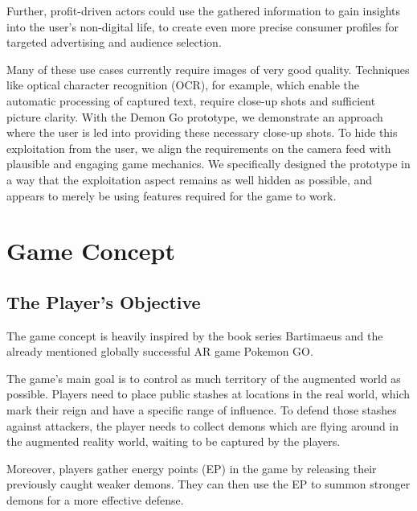 Further, profit-driven actors could use the gathered information to gain insights into the user's non-digital life, to create even more precise consumer profiles for targeted advertising and audience selection.

Many of these use cases currently require images of very good quality.
Techniques like optical character recognition (OCR), for example, which enable the automatic processing of captured text, require close-up shots and sufficient picture clarity.
With the Demon Go prototype, we demonstrate an approach where the user is led into providing these necessary close-up shots.
To hide this exploitation from the user, we align the requirements on the camera feed with plausible and engaging game mechanics.
We specifically designed the prototype in a way that the exploitation aspect remains as well hidden as possible, and appears to merely be using features required for the game to work.

\section{Game Concept}
\label{sec:concept}


\subsection{The Player's Objective}
The game concept is heavily inspired by the book series Bartimaeus and the already mentioned globally successful AR game Pokemon GO.

The game's main goal is to control as much territory of the augmented world as possible.
Players need to place public stashes at locations in the real world, which mark their reign and have a specific range of influence. 
To defend those stashes against attackers, the player needs to collect demons which are flying around in the augmented reality world, waiting to be captured by the players. 

Moreover, players gather energy points (EP) in the game by releasing their previously caught weaker demons. They can then use the EP to summon stronger demons for a more effective defense.

